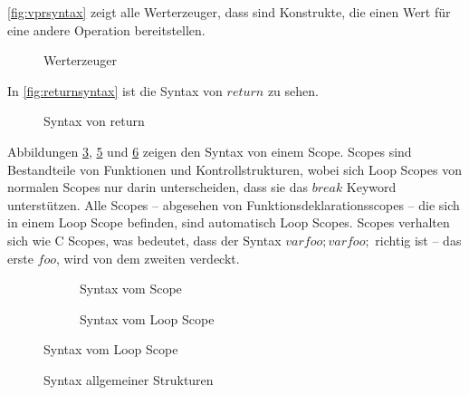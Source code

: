 {      \autoref{fig:vprsyntax} zeigt alle Werterzeuger, dass sind Konstrukte, die einen Wert für eine andere Operation bereitstellen.
      \begin{figure}[H]
        \centering
        \caption{Werterzeuger}
        \label{fig:vprsyntax}
      \end{figure}

      In \autoref{fig:returnsyntax} ist die Syntax von \myMIn$return$ zu sehen.
      \begin{figure}[H]
        \centering
        \caption{Syntax von return}
        \label{fig:returnsyntax}
      \end{figure}

      Abbildungen \ref{fig:scopesyntax}, \ref{fig:loopscopesyntax} und \ref{fig:commonsyntax} zeigen den Syntax von einem Scope. Scopes sind Bestandteile von Funktionen und Kontrollstrukturen, wobei sich Loop Scopes von normalen Scopes nur darin unterscheiden, dass sie das \myMIn$break$ Keyword unterstützen. Alle Scopes -- abgesehen von Funktionsdeklarationsscopes -- die sich in einem Loop Scope befinden, sind automatisch Loop Scopes. Scopes verhalten sich wie C Scopes, was bedeutet, dass der Syntax \myMIn$var foo; {var foo;}$ richtig ist -- das erste \myMIn$foo$, wird von dem zweiten verdeckt.
      \begin{figure}[H]
        \centering
        \begin{minipage}{.45\linewidth}
          \vspace*{2.45em}
          \begin{figure}[H]
            \centering
            \caption{Syntax vom Scope}
            \label{fig:scopesyntax}
          \end{figure}
        \end{minipage}%
        \begin{minipage}{.45\linewidth}
          \begin{figure}[H]
            \centering
            \caption{Syntax vom Loop Scope}
            \label{fig:loopscopesyntax}
          \end{figure}
        \end{minipage}
      \end{figure}

      \begin{figure}[H]
        \centering
        \caption{Syntax allgemeiner Strukturen}
        \label{fig:commonsyntax}
      \end{figure}

}
